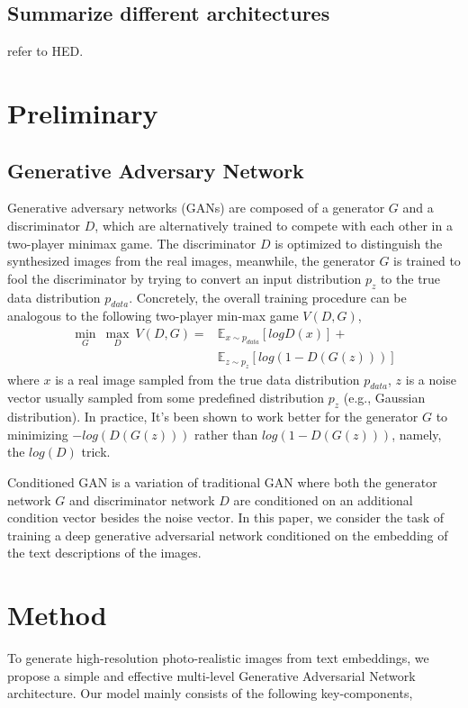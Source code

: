 \documentclass[10pt,twocolumn,letterpaper]{article}
\begin{document}
\subsection{Summarize different architectures}
refer to HED.

\section{Preliminary}
\subsection{Generative Adversary Network}
Generative adversary networks (GANs) are composed of a generator $G$ and a discriminator $D$, which are alternatively trained to compete with each other in a two-player minimax game. The discriminator $D$ is optimized to distinguish the synthesized images from the real images, meanwhile, the generator $G$ is trained to fool the discriminator by trying to convert an input distribution $p_z$ to the true data distribution $p_{data}$. Concretely, the overall training procedure can be analogous to the following two-player min-max game $V(D, G)$,
 \begin{equation}
 \label{game}
 \begin{split}
  \underset{G}{\min}\ \underset{D}{\max}\ V(D, G) =  &\mathbb{E}_{x\sim p_{data}}[log D(x)] +  \\
					  &\mathbb{E}_{z\sim p_{z}}[log (1-D(G(z)))]		   
 \end{split}
 \end{equation}
where $x$ is a real image sampled from the true data distribution $p_{data}$, $z$ is a noise vector usually sampled from some predefined distribution $p_{z}$ (e.g., Gaussian distribution).
In practice, It's been shown to work better for the generator $G$ to minimizing $-log(D(G(z)))$ rather than $log(1-D(G(z)))$, namely, the $log(D)$ trick.

Conditioned GAN \cite{isola2016image} is a variation of traditional GAN where both the generator network $G$ and discriminator network $D$ are conditioned on an additional condition vector besides the noise vector. In this paper, we consider the task of training a deep  generative adversarial network conditioned on the embedding of the text descriptions of the images.



\section{Method}
To generate high-resolution photo-realistic images from text embeddings, we propose a simple and effective multi-level Generative Adversarial Network architecture. Our model mainly consists of the following key-components,
\end{document}
